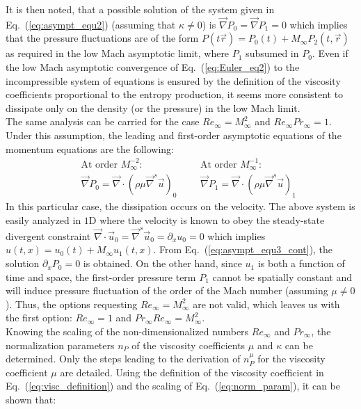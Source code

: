 \documentclass[preprint,10pt]{elsarticle}
\renewcommand{\div}{\vec{\nabla}\! \cdot \!}
\newcommand{\grad}{\vec{\nabla}}
\newcommand{\eqt}[1]{Eq.~(\ref{#1})}                     %
\begin{document}
It is then noted, that a possible solution of the system given in \eqt{eq:asympt_equ2} (assuming that $\kappa\neq 0$) is $\grad P_0 = \grad P_1 = 0$ which implies that the pressure fluctuations are of the form $P(t \vec{r}) = P_0(t) + M_{\infty}P_2(t, \vec{r}) $ as required in the low Mach asymptotic limit, where $P_1$ subsumed in $P_0$. Even if the low Mach asymptotic convergence of \eqt{eq:Euler_eq2} to the incompressible system of equations is ensured by the definition of the viscosity coefficients proportional to the entropy production, it seems more consistent to dissipate only on the density (or the pressure) in the  low Mach limit.\\
The same analysis can be carried for the case $Re_{\infty} = M_{\infty}^2$ and $Re_{\infty}Pr_{\infty} = 1$. Under this assumption, the leading and first-order asymptotic equations of the momentum equations are the following:
 \begin{subequations}\label{eq:asympt_equ3}
 \begin{eqnarray}\label{eq:asympt_equ3_cont}
&&\text{At order $M_{\infty}^{-2}$:} \nonumber\\
&& \grad P_0 = \div \left( \rho \mu \grad^s \vec{u} \right)_0
 \end{eqnarray}
\begin{eqnarray}\label{eq:asympt_equ3_mom}
&& \text{At order $M_{\infty}^{-1}$:} \nonumber\\
&&\grad P_1 = \div \left( \rho \mu \grad^s \vec{u} \right)_1
  \end{eqnarray}
 \end{subequations}
In this particular case, the dissipation occurs on the velocity. The above system is easily analyzed in $1$D where the velocity is known to obey the steady-state divergent constraint
$\div \vec{u}_0 = \grad^s \vec{u}_0 = \partial_x u_0 = 0$ which implies $u(t,x) = u_0(t) + M_{\infty} u_1(t,x)$. From \eqt{eq:asympt_equ3_cont}, the solution $\partial_x P_0 = 0$ is obtained. On the other hand, since $u_1$ is both a function of time and space, the first-order pressure term $P_1$ cannot be spatially constant and will induce pressure fluctuation of the order of the Mach number (assuming $\mu \neq 0$). Thus, the options requesting $Re_{\infty} = M_{\infty}^2$ are not valid, which leaves us with the first option: $Re_{\infty} = 1$ and $Pr_{\infty} Re_{\infty} = M_{\infty}^2$. \\
Knowing the scaling of the non-dimensionalized numbers $Re_{\infty}$ and $Pr_{\infty}$, the normalization parameters $n_P$ of the viscosity coefficients $\mu$ and $\kappa$ can be determined. Only the steps leading to the derivation of $n_P^{\mu}$ for the viscosity coefficient $\mu$ are detailed. Using the definition of the viscosity coefficient in \eqt{eq:visc_definition} and the scaling of \eqt{eq:norm_param}, it can be shown that:
\end{document}
